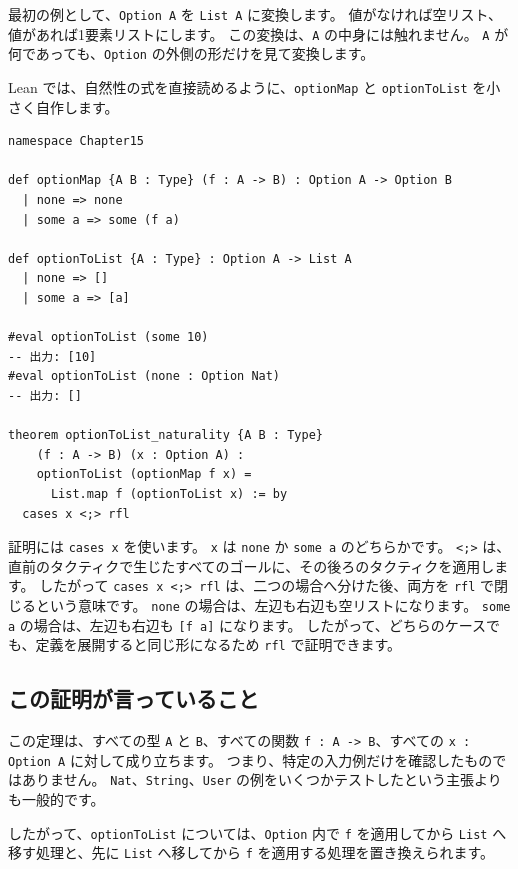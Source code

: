 最初の例として、\texttt{Option A} を \texttt{List A} に変換します。
値がなければ空リスト、値があれば1要素リストにします。
この変換は、\texttt{A} の中身には触れません。
\texttt{A} が何であっても、\texttt{Option} の外側の形だけを見て変換します。

Lean では、自然性の式を直接読めるように、\texttt{optionMap} と \texttt{optionToList} を小さく自作します。

\begin{listing}[htbp]
\begin{verbatim}
namespace Chapter15

def optionMap {A B : Type} (f : A -> B) : Option A -> Option B
  | none => none
  | some a => some (f a)

def optionToList {A : Type} : Option A -> List A
  | none => []
  | some a => [a]

#eval optionToList (some 10)
-- 出力: [10]
#eval optionToList (none : Option Nat)
-- 出力: []

theorem optionToList_naturality {A B : Type}
    (f : A -> B) (x : Option A) :
    optionToList (optionMap f x) =
      List.map f (optionToList x) := by
  cases x <;> rfl
\end{verbatim}
\caption{\texttt{optionToList\_naturality}}
\label{lst:ch15_option_to_list}
\end{listing}

証明には \texttt{cases x} を使います。
\texttt{x} は \texttt{none} か \texttt{some a} のどちらかです。
\texttt{<;>} は、直前のタクティクで生じたすべてのゴールに、その後ろのタクティクを適用します。
したがって \texttt{cases x <;> rfl} は、二つの場合へ分けた後、両方を \texttt{rfl} で閉じるという意味です。
\texttt{none} の場合は、左辺も右辺も空リストになります。
\texttt{some a} の場合は、左辺も右辺も \texttt{[f a]} になります。
したがって、どちらのケースでも、定義を展開すると同じ形になるため \texttt{rfl} で証明できます。

\subsection{この証明が言っていること}

この定理は、すべての型 \texttt{A} と \texttt{B}、すべての関数 \texttt{f : A -> B}、すべての \texttt{x : Option A} に対して成り立ちます。
つまり、特定の入力例だけを確認したものではありません。
\texttt{Nat}、\texttt{String}、\texttt{User} の例をいくつかテストしたという主張よりも一般的です。

したがって、\texttt{optionToList} については、\texttt{Option} 内で \texttt{f} を適用してから \texttt{List} へ移す処理と、先に \texttt{List} へ移してから \texttt{f} を適用する処理を置き換えられます。

